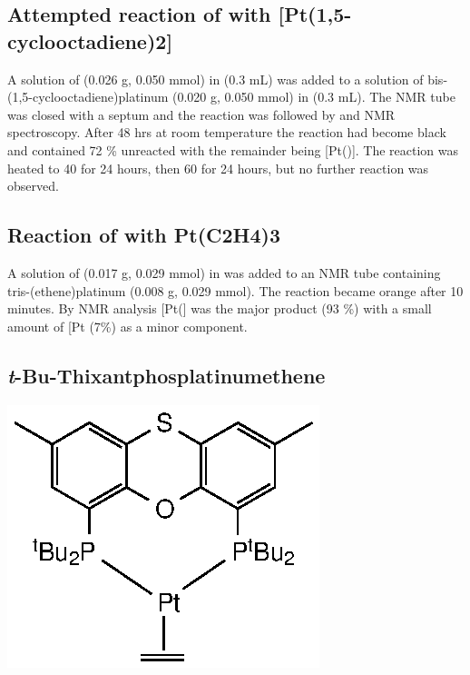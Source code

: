 \subsection*{Attempted reaction of \tButhixantphos with [Pt(1,5-cyclooctadiene)2]}

A solution of \tButhixantphos{} (0.026 g, 0.050 mmol) in  (0.3 mL) was added to a solution of bis-(1,5-cyclooctadiene)platinum (0.020 g, 0.050 mmol) in  (0.3 mL).  The NMR tube was closed with a septum and the reaction was followed by \proton{} and \phosphorus{} NMR spectroscopy.  After 48 hrs at room temperature the reaction had become black and contained 72 \% unreacted \tButhixantphos{} with the remainder being [Pt(\tButhixantphos)].  The reaction was heated to 40 \degC for 24 hours, then 60 \degC for 24 hours, but no further reaction was observed.  


\subsection*{Reaction of \Phthixantphos{} with Pt(C2H4)3}

A solution of \PhThixantphos{} (0.017 g, 0.029 mmol) in  was added to an NMR tube containing tris-(ethene)platinum (0.008 g, 0.029 mmol).  The reaction became orange after 10 minutes.  By \phosphorus{} NMR analysis [Pt(\Phthixantphos{}] was the major product (93 \%) with a small amount of [Pt\ce{(C2H4)(\Phthixantphos)]} (7\%) as a minor component.  

\subsection*{\emph{t}-Bu-Thixantphosplatinumethene}
\begin{structure}[h]
\begin{center}
\includegraphics{../Structures/StBuPlatinumethene.eps}
\end{center}
\end{structure}

